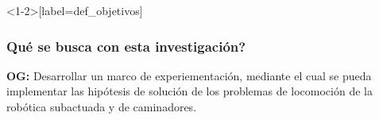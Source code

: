 \mode*
\begin{frame}<1-2>[label=def_objetivos]
  \frametitle{Qu\'e se busca con esta investigaci\'on?}
  \textbf{\textcolor{blueun}{OG:}} Desarrollar un \alert<2>{marco de experiementaci\'on}, mediante el cual se pueda implementar las hip\'otesis de soluci\'on de \alert<3>{los problemas de locomoci\'on} de la rob\'otica subactuada y de caminadores.\\
  \hyperlink<2>{def_framework}{}
  \hyperlink<3>{def_problema}{}
\end{frame}